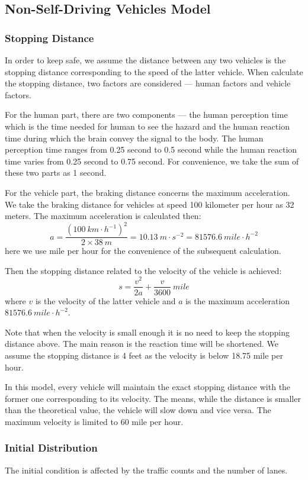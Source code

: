 \documentclass[a4paper]{article}
\begin{document}
	
	
	\subsection{Non-Self-Driving Vehicles Model}
	\subsubsection{Stopping Distance}\label{sd}
	In order to keep safe, we assume the distance between any two vehicles is the stopping distance corresponding to the speed of the latter vehicle. When calculate the stopping distance, two factors are considered — human factors and vehicle factors. 
	
	
	For the human part, there are two components — the human perception time which is the time needed for human to see the hazard and the human reaction time during which the brain convey the signal to the body. The human perception time ranges from 0.25 second to 0.5 second while the human reaction time varies from 0.25 second to 0.75 second.\cite{stopping} For convenience, we take the sum of these two parts as 1 second.
	
	For the vehicle part, the braking distance concerns the maximum acceleration. We take the braking distance for vehicles at speed 100 kilometer per hour as 32 meters. The maximum acceleration is calculated then:
	$$ a=\dfrac{(100\ km\cdot h^{-1})^2}{2\times 38\ m}=10.13\ m\cdot s^{-2}=81576.6\ mile\cdot h^{-2} $$
	here we use mile per hour for the convenience of the subsequent calculation.
	
	Then the stopping distance related to the velocity of the vehicle is achieved:
	$$ s=\dfrac{v^2}{2a}+\dfrac{v}{3600}\ mile $$
	where $ v $ is the velocity of the latter vehicle and $ a $ is the maximum acceleration $ 81576.6\ mile\cdot h^{-2} $.
	
	Note that when the velocity is small enough it is no need to keep the stopping distance above. The main reason is the reaction time will be shortened. We assume the stopping distance is 4 feet as the velocity is below 18.75 mile per hour.
	
	In this model, every vehicle will maintain the exact stopping distance with the former one corresponding to its velocity. The means, while the distance is smaller than the theoretical value, the vehicle will slow down and vice versa. The maximum velocity is limited to 60 mile per hour.
	
	\subsubsection{Initial Distribution}
	The initial condition is affected by the traffic counts and the number of lanes.
	
\end{document}
